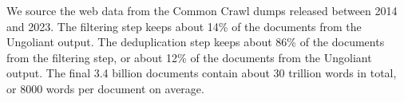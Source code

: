 

We source the web data from the Common Crawl dumps released between 2014 and 2023.
The filtering step keeps about 14\% of the documents from the Ungoliant output.
The deduplication step keeps about 86\% of the documents from the filtering step, or about 12\% of the documents from the Ungoliant output.
The final 3.4 billion documents contain about 30 trillion words in total, or 8000 words per document on average.